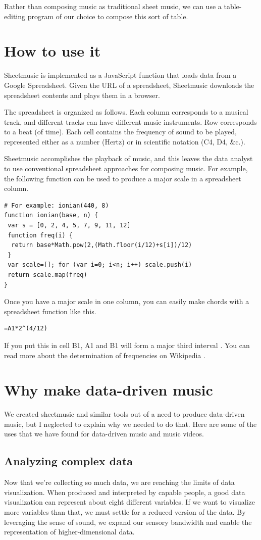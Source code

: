 \documentclass{acm_proc_article-sp}
\begin{document}
Rather than composing music as traditional sheet music,
we can use a table-editing program of our choice to compose
this sort of table.

\section{How to use it}
Sheetmusic is implemented as a JavaScript function that loads data
from a Google Spreadsheet. Given the URL of a spreadsheet, Sheetmusic
downloads the spreadsheet contents and plays them in a browser.

The spreadsheet is organized as follows. Each column corresponds
to a musical track, and different tracks can have different music instruments.
Row corresponds to a beat (of time).
Each cell contains the frequency of sound to be played, represented
either as a number (Hertz) or in scientific notation (C4, D4, \&c.).

Sheetmusic accomplishes the playback of music, and this leaves
the data analyst to use conventional spreadsheet approaches for
composing music. For example, the following function can be used
to produce a major scale in a spreadsheet column.
\begin{verbatim}
# For example: ionian(440, 8)
function ionian(base, n) {
 var s = [0, 2, 4, 5, 7, 9, 11, 12]
 function freq(i) {
  return base*Math.pow(2,(Math.floor(i/12)+s[i])/12)
 }
 var scale=[]; for (var i=0; i<n; i++) scale.push(i)
 return scale.map(freq)
}
\end{verbatim}
Once you have a major scale in one column, you can easily make
chords with a spreadsheet function like this.
\begin{verbatim}
=A1*2^(4/12)
\end{verbatim}
If you put this in cell B1, A1 and B1 will form a major third interval
\cite{majorthird}.
You can read more about the determination of frequencies on Wikipedia \cite{piano}.

\section{Why make data-driven music}
We created sheetmusic and similar tools out of a need to produce
data-driven music, but I neglected to explain why we needed to do
that. Here are some of the uses that we have found for data-driven
music and music videos.

\subsection{Analyzing complex data}
Now that we're collecting so much data, we are reaching the limits of
data visualization. When produced and interpreted by capable people,
a good data visualization can represent about eight different variables.
If we want to visualize more variables than that, we must settle for
a reduced version of the data. By leveraging the sense of sound,
we expand our sensory bandwidth and enable the representation of
higher-dimensional data.
\end{document}
